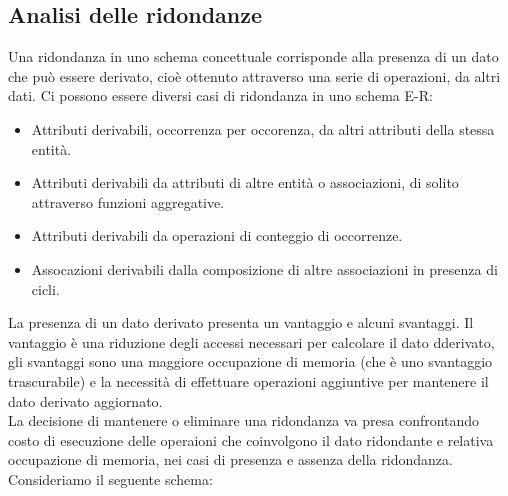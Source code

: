 \documentclass[12pt]{report}
\begin{document}
		\subsection{Analisi delle ridondanze}
		Una ridondanza in uno schema concettuale corrisponde alla presenza di un dato che può essere derivato, cioè ottenuto attraverso una serie di operazioni, da altri dati. Ci possono essere diversi casi di ridondanza in uno schema E-R:
		\begin{itemize}
			\item Attributi derivabili, occorrenza per occorenza, da altri attributi della stessa entità.
			\item Attributi derivabili da attributi di altre entità o associazioni, di solito attraverso funzioni aggregative.
			\item Attributi derivabili da operazioni di conteggio di occorrenze.
			\item Assocazioni derivabili dalla composizione di altre associazioni in presenza di cicli.
		\end{itemize}
		La presenza di un dato derivato presenta un vantaggio e alcuni svantaggi. Il vantaggio è una riduzione degli accessi necessari per calcolare il dato dderivato, gli svantaggi sono una maggiore occupazione di memoria (che è uno svantaggio trascurabile) e la necessità di effettuare operazioni aggiuntive per mantenere il dato derivato aggiornato. \\
		La decisione di mantenere o eliminare una ridondanza va presa confrontando costo di esecuzione delle operaioni che coinvolgono il dato ridondante e relativa occupazione di memoria, nei casi di presenza e assenza della ridondanza. \\
		Consideriamo il seguente schema:
		\begin{center}
	\end{center}
\end{document}
